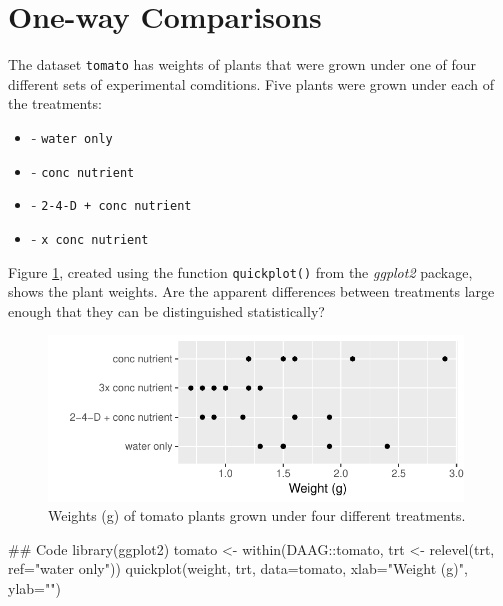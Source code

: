 \documentclass{tufte-book}\usepackage[]{graphicx}\usepackage[]{color}
\newcommand{\txtt}[1]{\texttt{#1}}
\newenvironment{itemizz}%
  {\begin{itemize} %
    \setlength{\itemsep}{2pt}%
    \setlength{\parskip}{2pt}} %
  {\end{itemize}}
\begin{document}
\section{One-way Comparisons}

The dataset \txtt{tomato} has weights of plants that were grown
under one of four different sets of experimental comditions.
Five plants were grown under each of the treatments:
\begin{itemizz}
  \item[-] \txtt{water only}
  \item[-] \txtt{conc nutrient}
  \item[-] \txtt{2-4-D + conc nutrient}
  \item[-] \txtt{x conc nutrient}
\end{itemizz}
Figure \ref{fig:Tomato}, created
using the function \txtt{quickplot()} from the {\em ggplot2} package,
shows the plant weights.  Are the apparent differences between
treatments large enough that they can be distinguished statistically?

\begin{figure}
\vspace*{-6pt}
\begin{Schunk}


\centerline{\includegraphics[width=0.98\textwidth]{figs/03-gg-tomato-1} }

\end{Schunk}
\caption{Weights (g) of tomato plants grown under four different
  treatments.\label{fig:Tomato}}
\end{figure}

\begin{Schunk}
\begin{Sinput}
## Code
library(ggplot2)
tomato <- within(DAAG::tomato, 
                 trt <- relevel(trt, ref="water only"))
quickplot(weight, trt, data=tomato,
          xlab="Weight (g)", ylab="")
\end{Sinput}
\end{Schunk}
\end{document}
